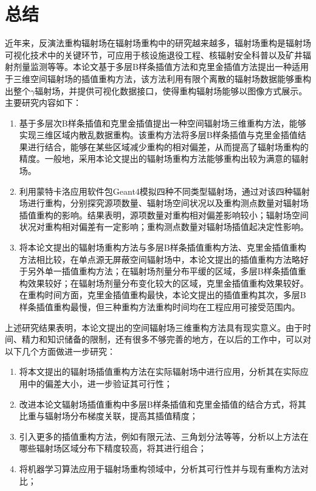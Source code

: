 \section{总结}
近年来，反演法重构辐射场在辐射场重构中的研究越来越多，辐射场重构是辐射场可视化技术中的关键环节，可应用于核设施退役工程、核辐射安全科普以及矿井辐射剂量监测等等。本论文基于多层B样条插值方法和克里金插值方法提出一种适用于三维空间辐射场的插值重构方法，该方法利用有限个离散的辐射场数据能够重构出整个$ \gamma $辐射场，并提供可视化数据接口，使得重构辐射场能够以图像方式展示。主要研究内容如下：

\begin{enumerate}
    \item 基于多层次B样条插值和克里金插值提出一种空间辐射场三维重构方法，能够实现三维区域内散乱数据重构。该重构方法将多层B样条插值与克里金插值结果进行结合，能够在某些区域减少重构的相对偏差，从而提高了辐射场重构的精度。一般地，采用本论文提出的辐射场重构方法能够重构出较为满意的辐射场。
    \item 利用蒙特卡洛应用软件包Geant4模拟四种不同类型辐射场，通过对该四种辐射场进行重构，分别探究源项数量、辐射场空间状况以及重构测点数量对辐射场插值重构的影响。结果表明，源项数量对重构相对偏差影响较小；辐射场空间状况对重构相对偏差有一定影响；重构测点数量对辐射场插值起决定性影响。
    \item 将本论文提出的辐射场重构方法与多层B样条插值重构方法、克里金插值重构方法相比较，在单点源无屏蔽空间辐射场中，本论文提出的插值重构方法略好于另外单一插值重构方法；在辐射场剂量分布平缓的区域，多层B样条插值重构效果较好；在辐射场剂量分布变化较大的区域，克里金插值重构效果较好。在重构时间方面，克里金插值重构最快，本论文提出的插值重构其次，多层B样条插值重构最慢，但三种重构方法重构时间均在工程应用可接受范围内。
\end{enumerate}

上述研究结果表明，本论文提出的空间辐射场三维重构方法具有现实意义。由于时间、精力和知识储备的限制，还有很多不够完善的地方，在以后的工作中，可以对以下几个方面做进一步研究：

\begin{enumerate}
    \item 将本文提出的辐射场插值重构方法在实际辐射场中进行应用，分析其在实际应用中的偏差大小，进一步验证其可行性；
    \item 改进本论文辐射场插值重构中多层B样条插值和克里金插值的结合方式，将其比重与辐射场分布梯度关联，提高其插值精度；
    \item 引入更多的插值重构方法，例如有限元法、三角划分法等等，分析以上方法在哪些辐射场区域分布下精度较高，将其进行组合；
    \item 将机器学习算法应用于辐射场重构领域中，分析其可行性并与现有重构方法对比；
\end{enumerate}